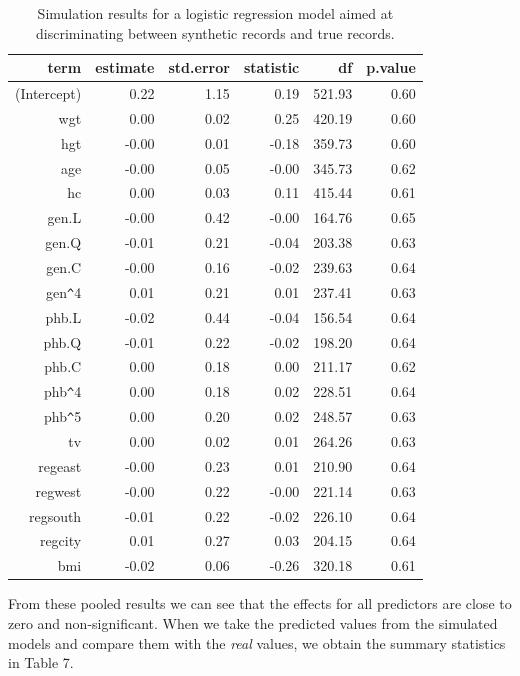 \documentclass[psych,article,submit,moreauthors,pdftex]{mdpi}
\begin{document}
\begin{table}[H]
\caption{Simulation results for a logistic regression model aimed at discriminating between synthetic records and true records.}
\centering
\begin{tabular}{rrrrrr}
  \hline
 term & estimate & std.error & statistic & df & p.value \\
  \hline
  (Intercept) & 0.22 & 1.15 & 0.19 & 521.93 & 0.60 \\ 
  wgt & 0.00 & 0.02 & 0.25 & 420.19 & 0.60 \\
  hgt & -0.00 & 0.01 & -0.18 & 359.73 & 0.60 \\
  age & -0.00 & 0.05 & -0.00 & 345.73 & 0.62 \\ 
  hc & 0.00 & 0.03 & 0.11 & 415.44 & 0.61\\
  gen.L & -0.00 & 0.42 & -0.00 & 164.76 & 0.65 \\
  gen.Q & -0.01 & 0.21 & -0.04 & 203.38 & 0.63 \\
  gen.C & -0.00 & 0.16 & -0.02 & 239.63 & 0.64 \\
  gen\verb|^|4 & 0.01 & 0.21 & 0.01 & 237.41 & 0.63 \\
  phb.L & -0.02 & 0.44 & -0.04 & 156.54 & 0.64 \\
  phb.Q & -0.01 & 0.22 & -0.02 & 198.20 & 0.64 \\
  phb.C & 0.00 & 0.18 & 0.00 & 211.17 & 0.62 \\
  phb\verb|^|4 & 0.00 & 0.18 & 0.02 & 228.51 & 0.64\\
  phb\verb|^|5 & 0.00 & 0.20 & 0.02 & 248.57 & 0.63\\
  tv & 0.00 & 0.02 & 0.01 & 264.26 & 0.63\\
  regeast & -0.00 & 0.23 & 0.01 & 210.90 & 0.64 \\ 
  regwest & -0.00 & 0.22 & -0.00 & 221.14 & 0.63 \\ 
  regsouth & -0.01 & 0.22 & -0.02 & 226.10 & 0.64 \\ 
  regcity & 0.01 & 0.27 & 0.03 & 204.15 & 0.64 \\ 
  bmi & -0.02 & 0.06 & -0.26 & 320.18 & 0.61 \\
   \hline
\end{tabular}
\end{table}

From these pooled results we can see that the effects for all predictors
are close to zero and non-significant. When we take the predicted values
from the simulated models and compare them with the \emph{real} values,
we obtain the summary statistics in Table 7.
\end{document}

